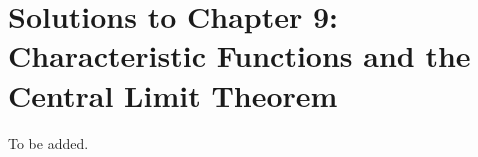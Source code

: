 \section{Solutions to Chapter 9: Characteristic Functions and the Central Limit Theorem}
\label{sec:solutions-chapter-9}

\setcounter{Lcount}{0}
\begin{list}{9.9.}{}
\item To be added.
\end{list}

\clearpage{}

